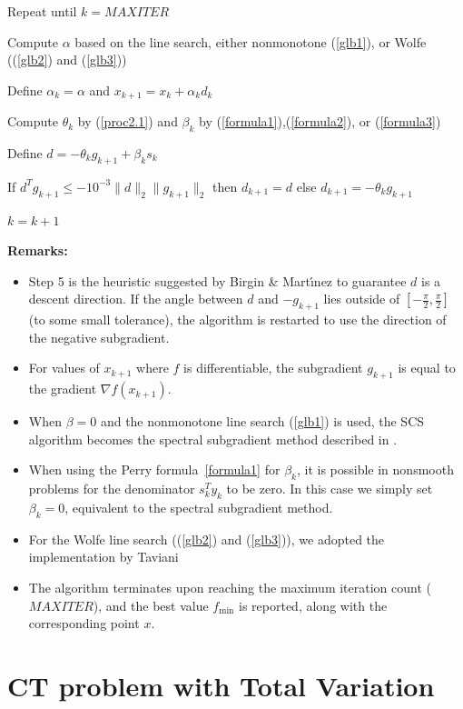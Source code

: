 \documentclass[]{interact}
\theoremstyle{plain}%
\theoremstyle{definition}
\theoremstyle{remark}
\begin{document}
\noindent
Repeat until $k=MAXITER$

\begin{enumerate}
\item Compute $\alpha$ based on the line search, either nonmonotone (\ref{glb1}), or Wolfe ((\ref{glb2}) and (\ref{glb3}))
\item Define $\alpha_k=\alpha$ and $x_{k+1}=x_k+\alpha_kd_k$
\item Compute $\theta_k$ by (\ref{proc2.1}) and $\beta_k$ by (\ref{formula1}),(\ref{formula2}), or (\ref{formula3})
\item Define $d = -\theta_kg_{k+1} +\beta_ks_k$
{\item If $d^Tg_{k+1}\leq -10^{-3}\parallel d \parallel_2 \parallel g_{k+1}\parallel_2$
\subitem then $d_{k+1}=d$
\subitem else $d_{k+1}=-\theta_kg_{k+1}$}
\item $k=k+1$
\end{enumerate}

\noindent
{\bf Remarks:}
\begin{itemize}
\item Step 5 is the heuristic suggested by Birgin \& Mart\'{\i}nez to guarantee $d$ is a descent direction. If the angle between $d$ and $-g_{k+1}$ lies outside of $[-\frac{\pi}{2}, \frac{\pi}{2}]$ (to some small tolerance), the algorithm is restarted to use the direction of the negative subgradient.
\item For values of $x_{k+1}$ where $f$ is differentiable, the subgradient $g_{k+1}$ is equal to the gradient $\nabla f(x_{k+1})$.
\item When $\beta =0$ and the nonmonotone line search (\ref{glb1}) is used, the SCS algorithm becomes the spectral subgradient method described in \cite{Loreto:19}.
\item When using the Perry formula~\eqref{formula1} for $\beta_k$, it is possible in nonsmooth problems for the denominator $s_k^Ty_k$ to be zero. In this case we simply set $\beta_k = 0$, equivalent to the spectral subgradient method.
\item For the Wolfe line search ((\ref{glb2}) and (\ref{glb3})), we adopted the implementation by Taviani \cite{Taviani}
\item {The algorithm terminates upon reaching the maximum iteration count ($MAXITER$)}, and the best value $f_{\min}$ is reported, along with the corresponding point $x$.
\end{itemize}

\section{CT problem with Total Variation}
\label{S:CT}
\end{document}
